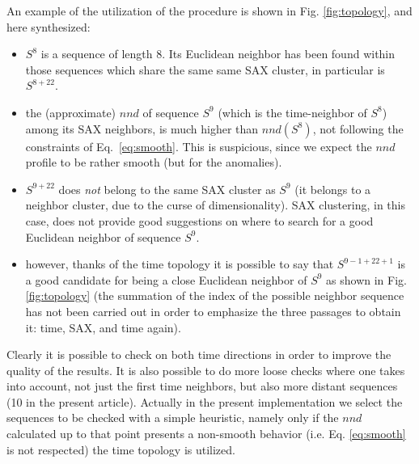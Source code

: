 \documentclass[a4paper,twoside]{article}
\begin{document}
% 
%
%
%
An example of the utilization of the procedure is shown in Fig. \ref{fig:topology}, and here synthesized:
\begin{itemize}
 \item $S^{8}$ is a sequence of length $8$. Its Euclidean neighbor has been found within those sequences which share the same same SAX cluster, in particular is $S^{8+22}$.
 
 \item the (approximate) $nnd$ of sequence $S^{9}$ (which is the time-neighbor of $S^{8}$) among its SAX neighbors, is much higher than $nnd(S^{8})$, not following the constraints of Eq.~\ref{eq:smooth}. 
 This is suspicious, since we expect the $nnd$ profile to be rather smooth (but for the anomalies).

 \item $S^{9+22}$ does \textit{not} belong to the same SAX cluster as $S^{9}$ (it belongs to a neighbor cluster, due to the curse of dimensionality). SAX clustering, in this case, does not provide good suggestions on where to search for a good Euclidean neighbor of sequence $S^{9}$.

 \item however, thanks of the time topology it is possible to say that $S^{9-1+22+1}$ is a good candidate for being a close Euclidean neighbor of $S^{9}$ as shown in Fig. \ref{fig:topology} (the summation of the index of the possible neighbor sequence has not been carried out in order to emphasize the three passages to obtain it: time, SAX, and time again).
\end{itemize}
%
Clearly it is possible to check on both time directions in order to improve the quality of the results. It is also possible to do more loose checks where one takes into account, not just the first time neighbors, but also more distant sequences (10 in the present article).
% 
Actually in the present implementation we select the sequences to be checked with a simple heuristic, namely only if the $nnd$ calculated up to that point presents a non-smooth behavior (i.e. Eq. \ref{eq:smooth} is not respected) the time topology is utilized.
\end{document}
